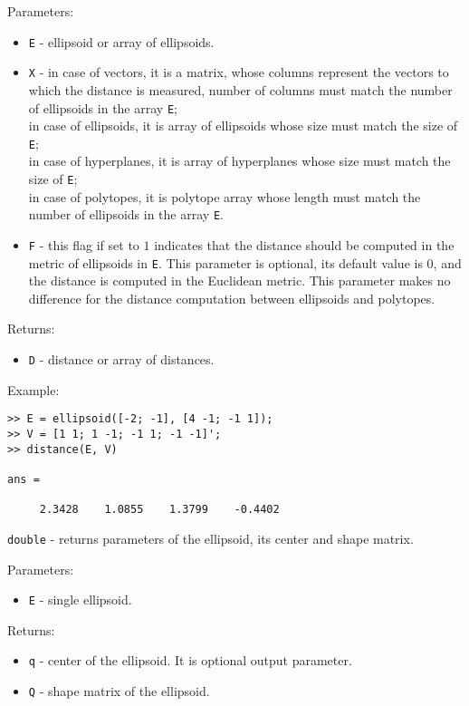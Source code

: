 Parameters:
\begin{itemize}
\item {\tt E} - ellipsoid or array of ellipsoids.
\item {\tt X} - in case of vectors, it is a matrix, whose columns represent
the vectors to which the distance is measured, number of columns must match
the number of ellipsoids in the array {\tt E};\\
in case of ellipsoids, it is array of ellipsoids whose size must match the
size of {\tt E};\\
in case of hyperplanes, it is array of hyperplanes whose size must match the
size of {\tt E};\\
in case of polytopes, it is polytope array whose length must match
the number of ellipsoids in the array {\tt E}.
\item {\tt F} - this flag if set to $1$ indicates that the distance should
be computed in the metric of ellipsoids in {\tt E}. This parameter is optional,
its default value is $0$, and the distance is computed in the Euclidean metric.
This parameter makes no difference for the distance computation
between ellipsoids and polytopes.
\end{itemize}

Returns:
\begin{itemize}
\item {\tt D} - distance or array of distances.
\end{itemize}

Example:
{\tt \begin{verbatim}
>> E = ellipsoid([-2; -1], [4 -1; -1 1]);
>> V = [1 1; 1 -1; -1 1; -1 -1]';
>> distance(E, V)

ans =

     2.3428    1.0855    1.3799    -0.4402
\end{verbatim} }

\newpage

{\Large {\tt double}} - returns parameters of the ellipsoid, its center
and shape matrix.

Parameters:
\begin{itemize}
\item {\tt E} - single ellipsoid.
\end{itemize}

Returns:
\begin{itemize}
\item {\tt q} - center of the ellipsoid. It is optional output parameter.
\item {\tt Q} - shape matrix of the ellipsoid.
\end{itemize}

